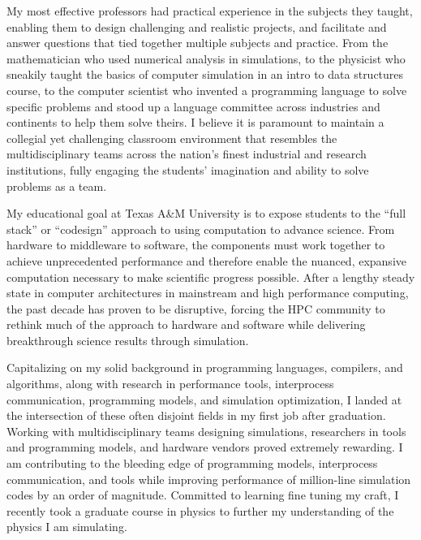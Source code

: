 \documentclass[10pt,letterpaper]{moderncv/moderncv}
\begin{document}
\date{January 20, 2021}
\opening{}
\makelettertitle%
\vspace{-.75cm}

My most effective professors had practical experience in the subjects they taught, enabling them to design challenging and realistic projects, and facilitate and answer questions that tied together multiple subjects and practice.  From the mathematician who used numerical analysis in simulations, to the physicist who sneakily taught the basics of computer simulation in an intro to data structures course, to the computer scientist who invented a programming language to solve specific problems and stood up a language committee across industries and continents to help them solve theirs.  I believe it is paramount to maintain a collegial yet challenging classroom environment that resembles the multidisciplinary teams across the nation's finest industrial and research institutions, fully engaging the students' imagination and ability to solve problems as a team.

My educational goal at Texas A\&M University is to expose students to the ``full stack'' or ``codesign'' approach to using computation to advance science.  From hardware to middleware to software, the components must work together to achieve unprecedented performance and therefore enable the nuanced, expansive computation necessary to make scientific progress possible.  After a lengthy steady state in computer architectures in mainstream and high performance computing, the past decade has proven to be disruptive, forcing the HPC community to rethink much of the approach to hardware and software while delivering breakthrough science results through simulation.

Capitalizing on my solid background in programming languages, compilers, and algorithms,
along with research in performance tools, interprocess communication, programming models, and simulation optimization,
I landed at the intersection of these often disjoint fields in my first job after graduation.  Working with multidisciplinary teams designing simulations, researchers in tools and programming models,
and hardware vendors proved extremely rewarding.  I am contributing to the bleeding edge of programming models, interprocess communication, and tools while improving
performance of million-line simulation codes by an order of magnitude.  Committed to learning fine tuning my craft, I recently took a graduate course in physics to further my understanding
of the physics I am simulating.
\end{document}

